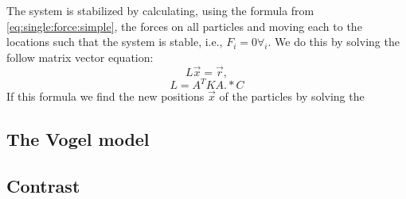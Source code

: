 The system is stabilized by calculating, using the formula from \eqref{eq:single:force:simple}, the forces on all particles and moving each to the locations such that the system is stable, i.e., $F_i = 0 \forall_i$. We do this by solving the follow matrix vector equation:
%
\begin{equation}\label{eq::}
	L\vec{x} = \vec{r},
\end{equation}
%
\begin{equation}\label{eq:a:}
	L = A^T K A .* C
\end{equation}
%
If this formula we find the new positions $\vec{x}$ of the particles by solving the 


\subsection{The Vogel model}\label{ss:method:vogel}


\subsection{Contrast}\label{ss:method:contrast}




